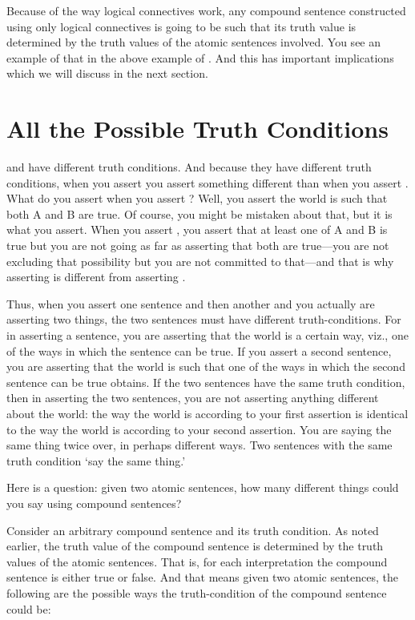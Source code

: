 Because of the way logical connectives work, any compound sentence constructed 
using only logical connectives is going to be such that its truth value is 
determined by the truth values of the atomic sentences involved. You see an 
example of that in the above example of 
. And this has important implications which we will discuss in the next section.


\section{All the Possible Truth Conditions}
\label{sec:NaturalLanguagePossibleTruthConditions}

 and  have different truth conditions. And because they 
have different truth conditions, when you assert  you assert 
something different than when you assert . What do you assert when 
you assert ? Well, you assert the world is such that both A and B 
are true. Of course, you might be mistaken about that, but it is what you 
assert.  When you assert , you assert that at least one of A and B is 
true but you are not going as far as asserting that both are true---you are not 
excluding that possibility but you are not committed to that---and that is why 
asserting  is different from asserting . 

Thus, when you assert one sentence and then another and you actually are 
asserting two things, the two sentences must have different truth-conditions.  
For in asserting a sentence, you are asserting that the world is a certain way, 
viz., one of the ways in which the sentence can be true. If you assert a second 
sentence, you are asserting that the world is such that one of the ways in which 
the second sentence can be true obtains. If the two sentences have the same 
truth condition, then in asserting the two sentences, you are not asserting 
anything different about the world: the way the world is according to your first 
assertion is identical to the way the world is according to your second 
assertion.  You are saying the same thing twice over, in perhaps different ways.  
Two sentences with the same truth condition `say the same thing.' 

Here is a question: given two atomic sentences, how many different things could 
you say using compound sentences?

Consider an arbitrary compound sentence and its truth condition. As noted 
earlier, the truth value of the compound sentence is determined by the truth 
values of the atomic sentences. That is, for each interpretation the compound 
sentence is either true or false. And that means given two atomic sentences, the 
following
are the possible ways the truth-condition of the compound sentence could be:

